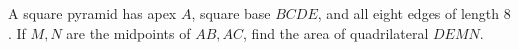 A square pyramid has apex $A$, square base $BCDE$, and all eight edges of length $8$. If $M,N$ are the midpoints of $AB,AC$, find the area of quadrilateral $DEMN$.
